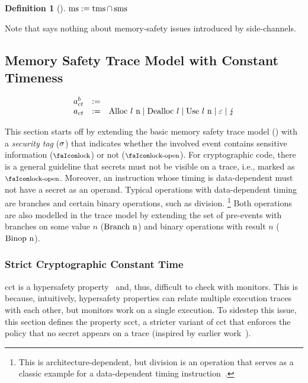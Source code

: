 \documentclass[dvipsnames,conference]{IEEEtran}
\theoremstyle{definition}
\newtheorem{definition}{Definition}[section]
\begin{document}
\begin{definition}[]\label{def:trace:msdef}
  $
  \mssafe:=\tmssafe \cap \smssafe
  $
\end{definition}

Note that  says nothing about memory-safety issues introduced by side-channels.

\subsection{Memory Safety Trace Model with Constant Timeness}

\[
  \begin{array}{rcll}
    \event[^b_{ct}] &:=& \\
    \event[_{ct}] &:=& \ev{Alloc \loc\ n} \mid \ev{Dealloc \loc} \mid \ev{Use \loc\ n} \mid \emptyevent \mid \lightning \\ 
  \end{array}
\]

This section starts off by extending the basic memory safety trace model () with a {\em security tag} ($\securitytag$) that indicates whether the involved event contains sensitive information ($\lock$) or not ($\unlock$).
For cryptographic code, there is a general guideline that secrets must not be visible on a trace, i.e., marked as $\unlock$.
Moreover, an instruction whose timing is data-dependent must not have a secret as an operand.
Typical operations with data-dependent timing are branches and certain binary operations, such as division. 
\footnote{
	This is architecture-dependent, but division is an operation that serves as a classic example for a data-dependent timing instruction~\cite[p.~755]{arm-refman}.
}
Both operations are also modelled in the trace model by extending the set of pre-events with branches on some value $n$ ($\ev{Branch\ n}$) and binary operations with result $n$ ($\ev{Binop\ n}$).

\subsubsection{Strict Cryptographic Constant Time}

\gls*{cct} is a hypersafety property~\cite{barthe2018sec} and, thus, difficult to check with monitors.
This is because, intuitively, hypersafety properties can relate multiple execution traces with each other, but monitors work on a single execution.
To sidestep this issue, this section defines the property \gls*{scct}, a stricter variant of \gls*{cct} that enforces the policy that no secret appears on a trace (inspired by earlier work~\cite{almeida2017jasmin}).
\end{document}

